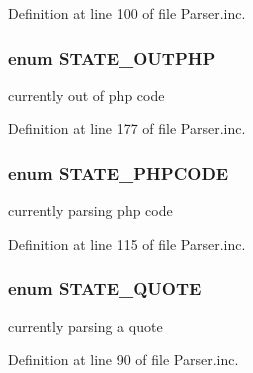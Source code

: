 \-Definition at line 100 of file \-Parser.\-inc.

\hypertarget{_parser_8inc_a39c01f0afdf4a08c88b90c59f3b6e6c4}{
\subsubsection[{\-S\-T\-A\-T\-E\-\_\-\-O\-U\-T\-P\-H\-P}]{\setlength{\rightskip}{0pt plus 5cm}enum {\bf \-S\-T\-A\-T\-E\-\_\-\-O\-U\-T\-P\-H\-P}}}\label{_parser_8inc_a39c01f0afdf4a08c88b90c59f3b6e6c4}
currently out of php code 

\-Definition at line 177 of file \-Parser.\-inc.

\hypertarget{_parser_8inc_ad062c44ff7032397289661f50ca51475}{
\subsubsection[{\-S\-T\-A\-T\-E\-\_\-\-P\-H\-P\-C\-O\-D\-E}]{\setlength{\rightskip}{0pt plus 5cm}enum {\bf \-S\-T\-A\-T\-E\-\_\-\-P\-H\-P\-C\-O\-D\-E}}}\label{_parser_8inc_ad062c44ff7032397289661f50ca51475}
currently parsing php code 

\-Definition at line 115 of file \-Parser.\-inc.

\hypertarget{_parser_8inc_ad599544d229dff9472abbc1824da37ae}{
\subsubsection[{\-S\-T\-A\-T\-E\-\_\-\-Q\-U\-O\-T\-E}]{\setlength{\rightskip}{0pt plus 5cm}enum {\bf \-S\-T\-A\-T\-E\-\_\-\-Q\-U\-O\-T\-E}}}\label{_parser_8inc_ad599544d229dff9472abbc1824da37ae}
currently parsing a quote 

\-Definition at line 90 of file \-Parser.\-inc.

